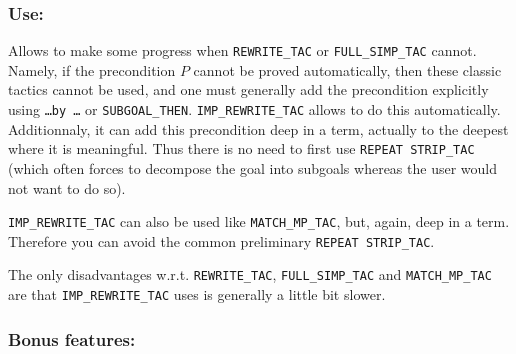 \documentclass{llncs}
\newcommand*\IMPREWRITETAC{\texttt{IMP\_REWRITE\_TAC}\xspace}
\newcommand*\REWRITETAC{\texttt{REWRITE\_TAC}\xspace}
\newcommand*\SIMPTAC{\texttt{FULL\_SIMP\_TAC}\xspace}
\newcommand*\SUBGOAL{\texttt{\ldots by \ldots}\xspace}
\newcommand*\MATCHMPTAC{\texttt{MATCH\_MP\_TAC}\xspace}
\begin{document}
    \subsubsection{Use:}
    Allows to make some progress when \REWRITETAC or \SIMPTAC cannot.
    Namely, if the precondition $P$ cannot be proved automatically, then these classic tactics cannot be used,
    and one must generally add the precondition explicitly using \SUBGOAL or \texttt{SUBGOAL\_THEN}.
    \IMPREWRITETAC allows to do this automatically.
    Additionnaly, it can add this precondition deep in a term, actually to the deepest where it is meaningful.
    Thus there is no need to first use \texttt{REPEAT STRIP\_TAC} (which often forces to decompose the goal
    into subgoals whereas the user would not want to do so).

    \IMPREWRITETAC can also be used like \MATCHMPTAC, but, again, deep in a term.
    Therefore you can avoid the common preliminary \texttt{REPEAT STRIP\_TAC}.

    The only disadvantages w.r.t. \REWRITETAC, \SIMPTAC and \MATCHMPTAC
    are that \IMPREWRITETAC uses is generally a little bit slower.

		\subsubsection{Bonus features:}
\end{document}
